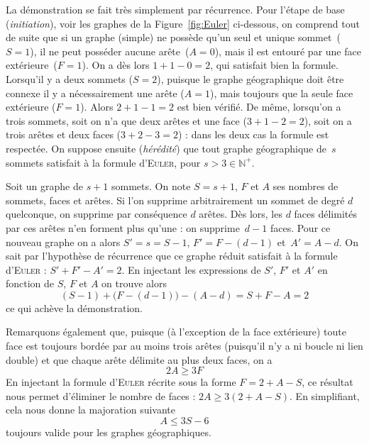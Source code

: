 La démonstration se fait très simplement par récurrence. Pour l'étape de base (\textit{initiation}), voir les graphes de la Figure~\ref{fig:Euler} ci-dessous, on comprend tout de suite que si un graphe (simple) ne possède qu'un seul et unique sommet~($S=1$), il ne peut posséder aucune arête~($A=0$), mais il est entouré par une face extérieure~($F=1$). On a dès lors $1+1-0=2$, qui satisfait bien la formule. Lorsqu'il y a deux sommets ($S=2$), puisque le graphe géographique doit être connexe il y a nécessairement une arête ($A=1$), mais toujours que la seule face extérieure ($F=1$). Alors $2+1-1=2$ est bien vérifié. De même, lorsqu'on a trois sommets, soit on n'a que deux arêtes et une face ($3+1-2=2$), soit on a trois arêtes et deux faces ($3+2-3=2$) : dans les deux cas la formule est respectée. On suppose ensuite (\textit{hérédité}) que tout graphe géographique de~$s$ sommets satisfait à la formule d'\textsc{Euler}, pour $s>3\in\mathbb{N}^+$.

Soit un graphe de $s+1$ sommets. On note $S=s+1$, $F$ et $A$ ses nombres de sommets, faces et arêtes. Si l'on supprime arbitrairement un sommet de degré $d$ quelconque, on supprime par conséquence $d$ arêtes. Dès lors, les $d$ faces délimités par ces arêtes n'en forment plus qu'une : on supprime~$d-1$ faces. Pour ce nouveau graphe on a alors $S'=s=S-1$, $F'=F-(d-1)$ et~$A'=A-d$. On sait par l'hypothèse de récurrence que ce graphe réduit satisfait à la formule d'\textsc{Euler} : $S'+F'-A'=2$. En injectant les expressions de $S'$, $F'$ et $A'$ en fonction de $S$, $F$ et $A$ on trouve alors $$(S-1)+\big(F-(d-1)\big)-(A-d)=S+F-A=2$$ ce qui achève la démonstration.\bigskip

Remarquons également que, puisque (à l'exception de la face extérieure) toute face est toujours bordée par au moins trois arêtes (puisqu'il n'y a ni boucle ni lien double) et que chaque arête délimite au plus deux faces, on a $$2A\geqslant 3F$$
%
%
En injectant la formule d'\textsc{Euler} récrite sous la forme $F=2+A-S$, ce résultat nous permet d'éliminer le nombre de faces : $2A\geqslant 3(2+A-S)$. En simplifiant, cela nous donne la majoration suivante $$A\leqslant 3S-6$$ toujours valide pour les graphes géographiques.\\

